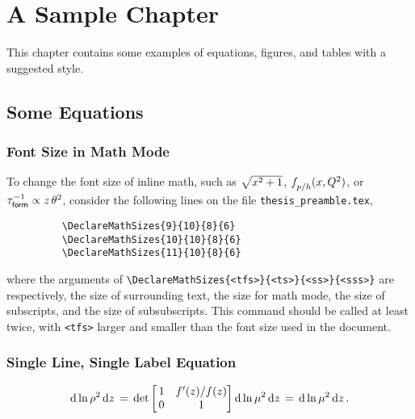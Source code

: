 \chapter{A Sample Chapter}
\label{chapter:SampleChapter}

This chapter contains some examples of equations, figures, and tables with a suggested style.

\section{Some Equations}

\subsection{Font Size in Math Mode}

To change the font size of inline math, such as $\sqrt{x_{}^{2} + 1}$, $f_{p/h}^{}(x, Q_{}^{2})$, or $\tau^{-1}_{\sf form} \propto z \,\theta_{}^{2}$, consider the following lines on the file \texttt{thesis\_preamble.tex},

\begin{figure}[h!]
\centering
\begin{BVerbatim}
	\DeclareMathSizes{9}{10}{8}{6}
	\DeclareMathSizes{10}{10}{8}{6}
	\DeclareMathSizes{11}{10}{8}{6}
\end{BVerbatim}
\end{figure}


\noindent where the arguments of \verb+\DeclareMathSizes{<tfs>}{<ts>}{<ss>}{<sss>}+ are respectively, the size of surrounding text, the size for math mode, the size of subscripts, and the size of subsubscripts.
%
This command should be called at least twice, with \verb+<tfs>+ larger and smaller than the font size used in the document. 

\subsection{Single Line, Single Label Equation}

\begin{align}
	{\rm d} \ln \rho_{}^{2} \, {\rm d} z
	\,=\,
	{\rm det}
	\begin{bmatrix}
		\,1 & f'(z) / f(z) \\
		\,0 & 1
	\end{bmatrix} 
	{\rm d} \ln \mu_{}^{2} \, {\rm d} z
	\,=\,
	{\rm d} \ln \mu_{}^{2} \, {\rm d} z
	\,.
\end{align}

